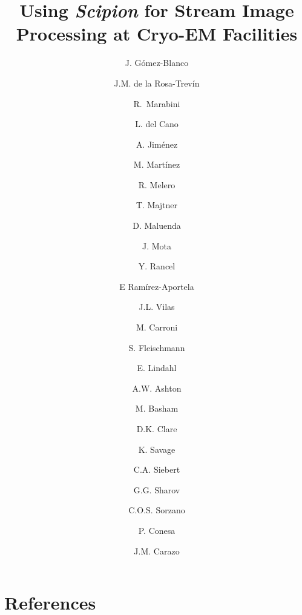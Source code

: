 \documentclass[12, authoryear, preprint]{elsarticle}
\def\scipion{\textit{Scipion}\xspace}
\begin{document}
\title{Using \scipion for Stream Image Processing at Cryo-EM Facilities}
\begin{frontmatter}

\author[canada]{J. G\'{o}mez-Blanco}
\author[su1]{J.M. de la Rosa-Trev\'{i}n}
\author[uam]{R.~Marabini}
\author[cnb]{L. del Cano}
\author[cnb]{A. Jim\'{e}nez}
\author[cnb]{M. Mart\'{i}nez}
\author[cnb]{R. Melero}
\author[cnb]{T. Majtner}
\author[cnb]{D. Maluenda}
\author[cnb]{J. Mota}
\author[cnb]{Y. Rancel}
\author[cnb]{E Ram\'{i}rez-Aportela}
\author[cnb]{J.L. Vilas}
\author[su1]{M. Carroni}
\author[su1]{S. Fleischmann}
\author[su1, su2]{E. Lindahl}
\author[ebic]{A.W. Ashton}
\author[ebic]{M. Basham}
\author[ebic]{D.K. Clare}
\author[ebic]{K. Savage}
\author[ebic]{C.A. Siebert}
\author[mrc]{G.G. Sharov}
\author[cnb]{C.O.S. Sorzano}
\author[cnb]{P. Conesa}
\author[cnb]{J.M. Carazo}


\address[canada]{Department of Anatomy and Cell Biology, McGill University, Montreal, Canada}
\address[cnb]{Biocomputing Unit, National Center for Biotechnology (CSIC), C/ Darwin, 3, Campus Universidad Aut\'{o}noma, 28049 Cantoblanco, Madrid, Spain.}
\address[su1]{Department of Biochemistry and Biophysics, Science for Life Laboratory, Stockholm University, Stockholm, Sweden} 
\address[uam]{Escuela Polit\'{e}cnica Superior, Universidad Aut\'{o}noma de Madrid, 28049 Cantoblanco, Madrid, Spain.}
\address[su2]{Swedish e-Science Research Center, KTH Royal Institute of Technology, Stockholm, Sweden}
\address[ebic]{Diamond Light Source, Harwell Science and Innovation Campus, Didcot OX11 0DE, United Kingdom}
\address[mrc]{Medical Research Council Laboratory of Molecular Biology, Francis Crick Avenue, Cambridge CB2 OQH, UK}




\end{frontmatter}







\section{References}



\clearpage
%

\newpage
%
%
\end{document}
